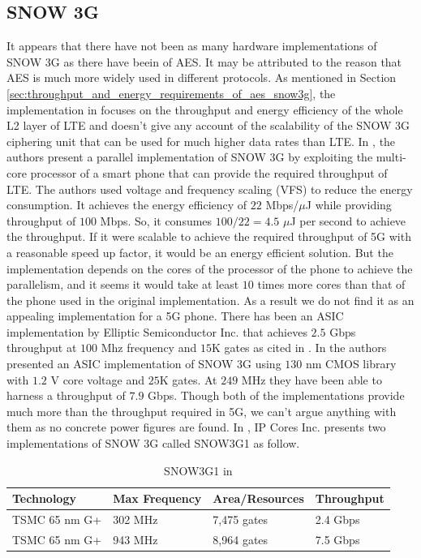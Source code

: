 \documentclass[lnicst,sechang,a4paper]{svmultln}
\begin{document}
\subsection{SNOW 3G}
\label{sub-sec:snow3gp}
It appears that there have not been as many hardware implementations of SNOW 3G as there have beein of AES. It may be attributed to the reason that AES is much more widely used in different protocols. As mentioned in Section \ref{sec:throughput_and_energy_requirements_of_aes_snow3g}, the implementation in \cite{IIS_Ruhr_2010} focuses on the throughput and energy efficiency of the whole L2 layer of LTE and doesn't give any account of the scalability of the SNOW 3G ciphering unit that can be used for much higher data rates than LTE. In \cite{IEEE_ICCT_2010}, the authors present a parallel implementation of SNOW 3G by exploiting the multi-core processor of a smart phone that can provide the required throughput of LTE. The authors used voltage and frequency scaling (VFS) to reduce the energy consumption. It achieves the energy efficiency of $22$ Mbps/$\mu$J while providing throughput of $100$ Mbps. So, it consumes $100/22 = 4.5$ $\mu$J per second to achieve the throughput. If it were scalable to achieve the required throughput of 5G with a reasonable speed up factor, it would be an energy efficient solution. But the implementation depends on the cores of the processor of the phone to achieve the parallelism, and it seems it would take at least $10$ times more cores than that of the phone used in the original implementation. As a result we do not find it as an appealing implementation for a 5G phone. There has been an ASIC implementation by Elliptic Semiconductor Inc. that achieves $2.5$ Gbps throughput at $100$ Mhz frequency and $15$K gates as cited in \cite{Greece_SNOW3G}. In \cite{Greece_SNOW3G} the authors presented an ASIC implementation of SNOW 3G using $130$ nm CMOS library with $1.2$ V core voltage and $25$K gates. At $249$ MHz they have been able to harness a throughput of $7.9$ Gbps. Though both of the implementations provide much more than the throughput required in 5G, we can't argue anything with them as no concrete power figures are found. In \cite{IP_cores}, IP Cores Inc. presents two implementations of SNOW 3G called SNOW3G1 as follow.
\begin{table}
\begin{center}
\begin{tabular}{|p{}
				|p{}
				|p{}
				|p{}|				
				}
\hline
Technology & Max Frequency & Area/Resources & Throughput \\
\hline
TSMC 65 nm G+ & 302 MHz & 7,475 gates & 2.4 Gbps \\ \hline
TSMC 65 nm G+ & 943 MHz & 8,964 gates & 7.5 Gbps \\ \hline
\end{tabular}
\end{center}
\caption{SNOW3G1 in \cite{IP_cores}}
\label{table:aes_implementation}
\end{table}
\end{document}
